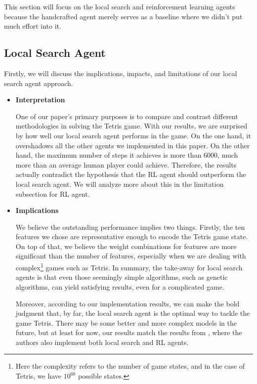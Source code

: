 \documentclass[letterpaper]{article} %
\begin{document}
This section will focus on the local search and reinforcement learning agents because the handcrafted agent merely serves as a baseline where we didn't put much effort into it. 

\subsection{Local Search Agent}
Firstly, we will discuss the implications, impacts, and limitations of our local search agent approach. 
\begin{itemize}
\item \textbf{Interpretation}
  
One of our paper's primary purposes is to compare and contrast different methodologies in solving the Tetris game. With our results, we are surprised by how well our local search agent performs in the game. On the one hand, it overshadows all the other agents we implemented in this paper. On the other hand, the maximum number of steps it achieves is more than 6000, much more than an average human player could achieve. Therefore, the results actually contradict the hypothesis that the RL agent should outperform the local search agent. We will analyze more about this in the limitation subsection for RL agent.

\item \textbf{Implications}

We believe the outstanding performance implies two things. Firstly, the ten features we chose are representative enough to encode the Tetris game state. On top of that, we believe the weight combinations for features are more significant than the number of features, especially when we are dealing with complex\footnote{Here the complexity refers to the number of game states, and in the case of Tetris, we have $10^{60}$ possible states.} games such as Tetris. In summary, the take-away for local search agents is that even those seemingly simple algorithms, such as genetic algorithms, can yield satisfying results, even for a complicated game.

Moreover, according to our implementation results, we can make the bold judgment that, by far, the local search agent is the optimal way to tackle the game Tetris. There may be some better and more complex models in the future, but at least for now, our results match the results from , where the authors also implement both local search and RL agents.
  


\end{itemize}
\end{document}
